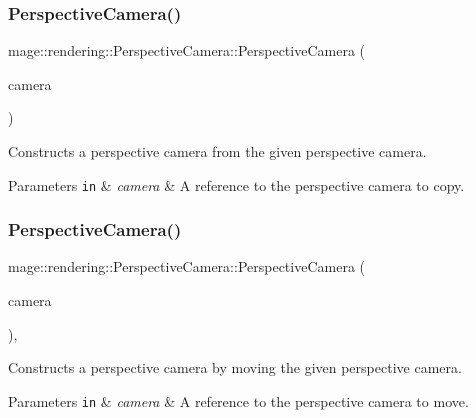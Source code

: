 \subsubsection{\texorpdfstring{Perspective\+Camera()}{PerspectiveCamera()}\hspace{0.1cm}{\footnotesize\ttfamily [2/3]}}
{\footnotesize\ttfamily mage\+::rendering\+::\+Perspective\+Camera\+::\+Perspective\+Camera (\begin{DoxyParamCaption}\item[{const \hyperlink{classmage_1_1rendering_1_1_perspective_camera}{Perspective\+Camera} \&}]{camera }\end{DoxyParamCaption})\hspace{0.3cm}{\ttfamily [delete]}}

Constructs a perspective camera from the given perspective camera.


\begin{DoxyParams}[1]{Parameters}
\mbox{\tt in}  & {\em camera} & A reference to the perspective camera to copy. \\
\hline
\end{DoxyParams}
\hypertarget{classmage_1_1rendering_1_1_perspective_camera_a3d342252cefbffe69537e1ccc95a379a}{}\label{classmage_1_1rendering_1_1_perspective_camera_a3d342252cefbffe69537e1ccc95a379a} 
\subsubsection{\texorpdfstring{Perspective\+Camera()}{PerspectiveCamera()}\hspace{0.1cm}{\footnotesize\ttfamily [3/3]}}
{\footnotesize\ttfamily mage\+::rendering\+::\+Perspective\+Camera\+::\+Perspective\+Camera (\begin{DoxyParamCaption}\item[{\hyperlink{classmage_1_1rendering_1_1_perspective_camera}{Perspective\+Camera} \&\&}]{camera }\end{DoxyParamCaption})\hspace{0.3cm}{\ttfamily [default]}, {\ttfamily [noexcept]}}

Constructs a perspective camera by moving the given perspective camera.


\begin{DoxyParams}[1]{Parameters}
\mbox{\tt in}  & {\em camera} & A reference to the perspective camera to move. \\
\hline
\end{DoxyParams}
\hypertarget{classmage_1_1rendering_1_1_perspective_camera_ac9bc0faebd323ca26d0311e35612d219}{}\label{classmage_1_1rendering_1_1_perspective_camera_ac9bc0faebd323ca26d0311e35612d219} 
